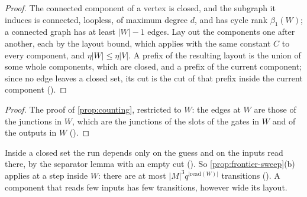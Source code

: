 \documentclass[11pt]{article}
\newcommand{\leanrefs}[1]{{\unskip\nobreak\hfil\penalty50\hskip1em\null\nobreak\hfil
  {\normalfont\small #1}\parfillskip=0pt\finalhyphendemerits=0\par}}
\newcommand{\leanref}[1]{\leanrefs{\lean{#1}}}
\theoremstyle{plain}
\theoremstyle{definition}
\theoremstyle{remark}
\newcommand{\LB}{\mathrm{LB}}
\newcommand{\card}[1]{\lvert #1\rvert}
\newcommand{\rd}{\mathrm{read}}
\begin{document}

\begin{proof}
The connected component of a vertex is closed, and the subgraph it induces is connected,
loopless, of maximum degree $d$, and has cycle rank $\beta_1(W)$; a connected graph has at least
$\card W - 1$ edges. Lay out the components one after another, each by the layout bound, which
applies with the same constant $C$ to every component, and $\eta\card W \le \eta\card V$. A
prefix of the resulting layout is the union of some whole components, which are closed, and a
prefix of the current component; since no edge leaves a closed set, its cut is the cut of that
prefix inside the current component ().
\end{proof}


\begin{proof}
The proof of \cref{prop:counting}, restricted to $W$: the edges at $W$ are those of the junctions
in $W$, which are the junctions of the slots of the gates in $W$ and of the outputs in $W$
().
\end{proof}

Inside a closed set the run depends only on the guess and on the inputs read there, by the
separator lemma with an empty cut (). So
\cref{prop:frontier-sweep}(b) applies at a step inside $W$: there are at most
$\card M^3 q^{\card{\rd(W)}}$ transitions (). A component that reads few inputs has few
transitions, however wide its layout.
\end{document}
